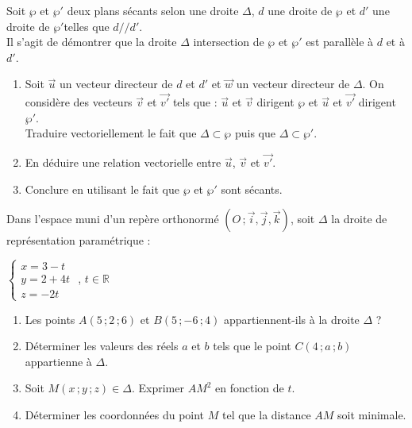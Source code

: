 \documentclass{cornouaille}
\begin{document}
\begin{colonne*exercice}
\begin{exercice}
    Soit $\wp$ et $\wp'$ deux plans sécants selon une droite $\Delta$,
    $d$ une droite de $\wp$ et $d'$ une droite de $\wp'$telles que
    $d//d'$.  \\ Il s'agit de démontrer que la droite $\Delta$
    intersection de $\wp$ et $\wp'$ est parallèle à $d$ et à $d'$.
    \begin{enumerate}
    \item Soit $\vec{u}$ un vecteur directeur de $d$ et $d'$ et
      $\vec{w}$ un vecteur directeur de $\Delta$.  On considère des
      vecteurs $\vec{v}$ et $\vec{v'}$ tels que : $\vec{u}$ et
      $\vec{v}$ dirigent $\wp$ et
      $\vec{u}$ et $\vec{v'}$ dirigent $\wp'$.\\
      Traduire vectoriellement le fait que $\Delta\subset\wp$ puis que
      $\Delta\subset\wp'$.
    \item En déduire une relation vectorielle entre $\vec{u}$,
      $\vec{v}$ et $\vec{v'}$.
    \item Conclure en utilisant le fait que $\wp$ et $\wp'$ sont
      sécants.
    \end{enumerate}
  \end{exercice}

  \begin{exercice}
    Dans l'espace muni d'un repère orthonormé
    $(O\,; \vec{i},\vec{j},\vec{k})$, soit $\Delta$ la droite de
    représentation paramétrique :

    \begin{center}
      $\begin{cases}x=3-t \\y=2+4t \\z=-2t \end{cases}$ ,
      $t\in\mathbb{R}$
    \end{center}

    \begin{enumerate}
    \item Les points $A(5\,;2\,;6)$ et $B(5\,;-6\,;4)$
      appartiennent-ils à la droite $\Delta$ ?
    \item Déterminer les valeurs des réels $a$ et $b$ tels que le
      point $C(4\,;a\,;b)$ appartienne à $\Delta$.
    \item Soit $M(x\,;y\,;z)\in \Delta$. Exprimer $AM^2$ en fonction
      de $t$.
    \item Déterminer les coordonnées du point $M$ tel que la distance
      $AM$ soit minimale.
    \end{enumerate}
  \end{exercice}


\end{colonne*exercice}
\end{document}
